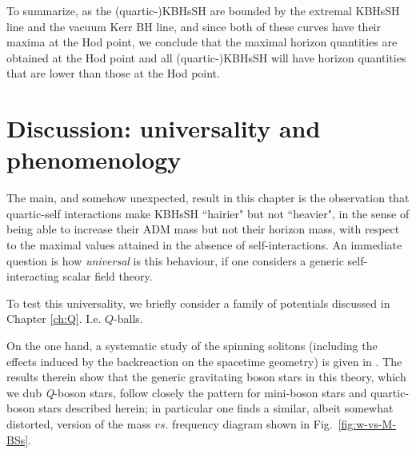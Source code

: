 To summarize, as the (quartic-)KBHsSH are bounded by the extremal KBHsSH line and the vacuum Kerr BH line,  and since both of these curves have their maxima at the Hod point, 
we conclude that the maximal horizon quantities are obtained at the Hod point and all 
(quartic-)KBHsSH will have horizon quantities that are
lower than those at the Hod point.



\section{Discussion: universality and phenomenology}
\label{sec_V}
The main, and somehow unexpected, result in this chapter is the observation that quartic-self interactions make KBHsSH ``hairier" but not ``heavier", in the sense of being able to increase their ADM mass but not their horizon mass, with respect to the maximal values attained in the absence of self-interactions. An immediate question is how \textit{universal} is this behaviour, if one considers a generic self-interacting scalar field theory.

To test this universality, we briefly consider a family of potentials discussed in Chapter \ref{ch:Q}.
I.e. $Q$-balls.

On the one hand, a systematic study of the spinning solitons 
(including the effects induced by the backreaction on the spacetime geometry) 
is given in \cite{Kleihaus:2005me}.
The results therein show that the
 generic gravitating boson stars in this theory, which we dub \textit{Q}-boson stars, follow closely the pattern for mini-boson stars and quartic-boson stars described herein; in particular 
one finds a similar, albeit somewhat distorted, version of the mass $vs.$ frequency diagram shown in Fig.~\ref{fig:w-vs-M-BSs}.

